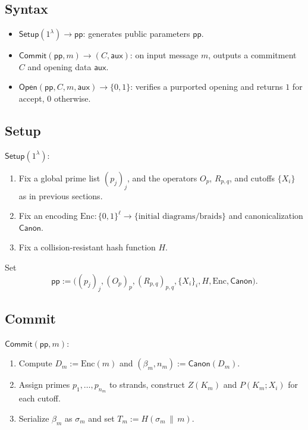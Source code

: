 \documentclass[11pt]{article}
\begin{document}
\subsection{Syntax}

\begin{itemize}
  \item $\mathsf{Setup}(1^\lambda) \to \mathsf{pp}$: generates public parameters $\mathsf{pp}$.
  \item $\mathsf{Commit}(\mathsf{pp}, m) \to (C,\mathsf{aux})$: on input message $m$, outputs a commitment $C$ and opening data $\mathsf{aux}$.
  \item $\mathsf{Open}(\mathsf{pp}, C, m, \mathsf{aux}) \to \{0,1\}$: verifies a purported opening and returns $1$ for accept, $0$ otherwise.
\end{itemize}

\subsection{Setup}

$\mathsf{Setup}(1^\lambda)$:

\begin{enumerate}
  \item Fix a global prime list $(p_j)_j$, and the operators $O_p$, $R_{p,q}$, and cutoffs $\{X_i\}$ as in previous sections.
  \item Fix an encoding $\mathrm{Enc}: \{0,1\}^\ell \to \{\text{initial diagrams/braids}\}$ and canonicalization $\mathsf{Canon}$.
  \item Fix a collision-resistant hash function $H$.
\end{enumerate}

Set
\[
  \mathsf{pp} := \big( (p_j)_j, (O_p)_p, (R_{p,q})_{p,q}, \{X_i\}_i, H, \mathrm{Enc}, \mathsf{Canon} \big).
\]

\subsection{Commit}

$\mathsf{Commit}(\mathsf{pp}, m)$:

\begin{enumerate}
  \item Compute $D_m := \mathrm{Enc}(m)$ and $(\beta_m,n_m) := \mathsf{Canon}(D_m)$.
  \item Assign primes $p_1,\dots,p_{n_m}$ to strands, construct $Z(K_m)$ and $P(K_m;X_i)$ for each cutoff.
  \item Serialize $\beta_m$ as $\sigma_m$ and set $T_m := H(\sigma_m \,\|\, m)$.
\end{enumerate}
\end{document}
